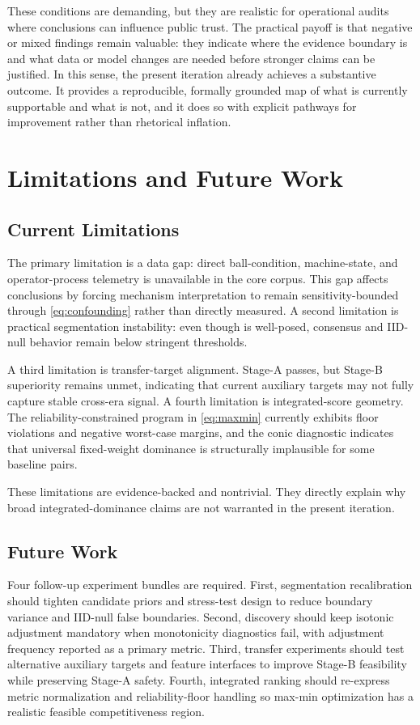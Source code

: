 \documentclass{article} %
\begin{document}
These conditions are demanding, but they are realistic for operational audits where conclusions can influence public trust. The practical payoff is that negative or mixed findings remain valuable: they indicate where the evidence boundary is and what data or model changes are needed before stronger claims can be justified. In this sense, the present iteration already achieves a substantive outcome. It provides a reproducible, formally grounded map of what is currently supportable and what is not, and it does so with explicit pathways for improvement rather than rhetorical inflation.

\section{Limitations and Future Work}\label{sec:limitations}
\subsection{Current Limitations}
The primary limitation is a data gap: direct ball-condition, machine-state, and operator-process telemetry is unavailable in the core corpus. This gap affects conclusions by forcing mechanism interpretation to remain sensitivity-bounded through \eqref{eq:confounding} rather than directly measured. A second limitation is practical segmentation instability: even though  is well-posed, consensus and IID-null behavior remain below stringent thresholds.

A third limitation is transfer-target alignment. Stage-A passes, but Stage-B superiority remains unmet, indicating that current auxiliary targets may not fully capture stable cross-era signal. A fourth limitation is integrated-score geometry. The reliability-constrained program in \eqref{eq:maxmin} currently exhibits floor violations and negative worst-case margins, and the conic diagnostic indicates that universal fixed-weight dominance is structurally implausible for some baseline pairs.

These limitations are evidence-backed and nontrivial. They directly explain why broad integrated-dominance claims are not warranted in the present iteration.

\subsection{Future Work}
Four follow-up experiment bundles are required. First, segmentation recalibration should tighten candidate priors and stress-test design to reduce boundary variance and IID-null false boundaries. Second, discovery should keep isotonic adjustment mandatory when monotonicity diagnostics fail, with adjustment frequency reported as a primary metric. Third, transfer experiments should test alternative auxiliary targets and feature interfaces to improve Stage-B feasibility while preserving Stage-A safety. Fourth, integrated ranking should re-express metric normalization and reliability-floor handling so max-min optimization has a realistic feasible competitiveness region.
\end{document}
